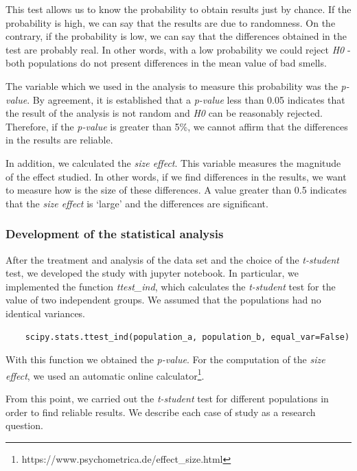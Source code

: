 This test allows us to know the probability to obtain results just by chance. If the probability is high, we can say that the results are due to randomness. On the contrary, if the probability is low, we can say that the differences obtained in the test are probably real. In other words, with a low probability we could reject \textit{H0} -both populations do not present differences in the mean value of bad smells. 

The variable which we used in the analysis to measure this probability was the \textit{p-value}. By agreement, it is established that a \textit{p-value} less than 0.05 indicates that the result of the analysis is not random and \textit{H0} can be reasonably rejected. Therefore, if the \textit{p-value} is greater than 5\%, we cannot affirm that the differences in the results are reliable.  

In addition, we calculated the \textit{size effect}. This variable measures the magnitude of the effect studied. In other words, if we find differences in the results, we want to measure how is the size of these differences. A value greater than 0.5 indicates that the \textit{size effect} is `large' and the differences are significant.

\subsubsection{Development of the statistical analysis}
\label{subsubsec:development_statistical_analysis}

After the treatment and analysis of the data set and the choice of the \textit{t-student} test, we developed the study with jupyter notebook. In particular, we implemented the function \textit{ttest\_ind}, which calculates the \textit{t-student} test for the value of two independent groups. We assumed that the populations had no identical variances.


{\footnotesize
\begin{verbatim}
    scipy.stats.ttest_ind(population_a, population_b, equal_var=False)
\end{verbatim}
}

With this function we obtained the \textit{p-value}. For the computation of the \textit{size effect}, we used an automatic online calculator\footnote{https://www.psychometrica.de/effect\_size.html}.

From this point, we carried out the \textit{t-student} test for different populations in order to find reliable results. We describe each case of study as a research question.


